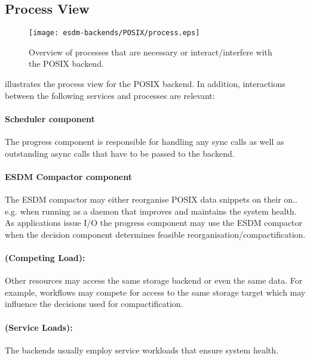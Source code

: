 \subsection{Process View}
\label{backend: posix/process}

\begin{figure}
	\centering
	\texttt{[image: esdm-backends/POSIX/process.eps]}
	\caption{Overview of processes that are necessary or interact/interfere with the POSIX backend.}
	\label{fig:backend posix process view}
\end{figure}

 illustrates the process view for the POSIX backend. In addition, interactions between the following services and processes are relevant:


\paragraph{Scheduler component}
The progress component is responsible for handling any sync calls as well as outstanding async calls that have to be passed to the backend.


\paragraph{ESDM Compactor component}
The ESDM compactor may either reorganise POSIX data snippets on their on.. e.g. when running as a daemon that improves and maintains the system health.
As applications issue I/O the progress component may use the ESDM compactor when the decision component determines feasible reorganisation/compactification.


\paragraph{(Competing Load):}
Other resources may access the same storage backend or even the same data.
For example, workflows may compete for access to the same storage target which may influence the decisions used for compactification.


\paragraph{(Service Loads):}
The backends usually employ service workloads that ensure system health.





